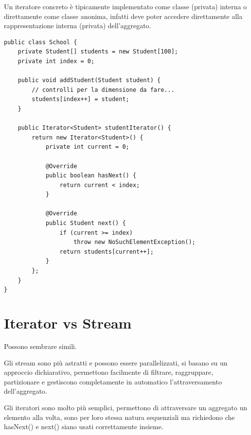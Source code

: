Un iteratore concreto è tipicamente implementato come classe (privata) interna o direttamente come classe anonima, infatti deve poter accedere direttamente alla
rappresentazione interna (privata) dell’aggregato.
\begin{lstlisting}
public class School {
    private Student[] students = new Student[100];
    private int index = 0;
    
    public void addStudent(Student student) {
        // controlli per la dimensione da fare...
        students[index++] = student;
    }

    public Iterator<Student> studentIterator() {
        return new Iterator<Student>() {
            private int current = 0;

            @Override
            public boolean hasNext() {
                return current < index;
            }

            @Override
            public Student next() {
                if (current >= index)
                    throw new NoSuchElementException();
                return students[current++];
            }
        };
    }
}
\end{lstlisting}

\section{Iterator vs Stream}

Possono sembrare simili.

Gli stream sono più astratti e possono essere parallelizzati, si basano su un approccio dichiarativo, permettono facilmente di filtrare, raggruppare, partizionare e 
gestiscono completamente in automatico l’attraversamento dell’aggregato.

Gli iteratori sono molto più semplici, permettono di attraversare un aggregato un elemento alla volta, sono per loro stessa natura sequenziali ma richiedono che hasNext() 
e next() siano usati correttamente insieme.